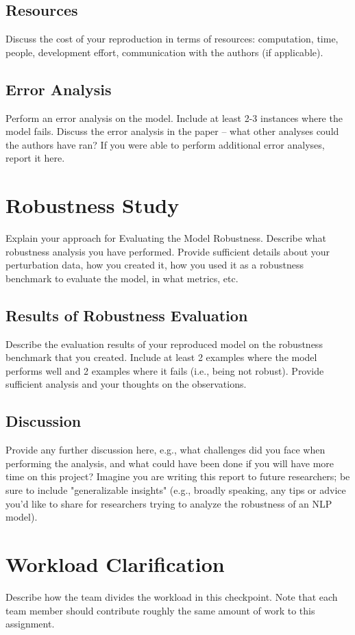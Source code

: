 \documentclass[11pt,a4paper]{article}
\begin{document}
\subsection{Resources}
Discuss the cost of your reproduction in terms of resources: computation, time, people, development effort, communication with the authors (if applicable).


\subsection{Error Analysis}
Perform an error analysis on the model. Include at least 2-3 instances where the model fails. Discuss the error analysis in the paper -- what other analyses could the authors have ran? If you were able to perform additional error analyses, report it here.

\section{Robustness Study}
Explain your approach for Evaluating the Model Robustness. Describe what robustness analysis you have performed. Provide sufficient details about your perturbation data, how you created it, how you used it as a robustness benchmark to evaluate the model, in what metrics, etc.

\subsection{Results of Robustness Evaluation}
Describe the evaluation results of your reproduced model on the robustness benchmark that you created. Include at least 2 examples where the model performs well and 2 examples where it fails (i.e., being not robust). Provide sufficient analysis and your thoughts on the observations.

\subsection{Discussion} 
Provide any further discussion here, e.g., what challenges did you face when performing the analysis, and what could have been done if you will have more time on this project? Imagine you are writing this report to future researchers; be sure to include "generalizable insights" (e.g., broadly speaking, any tips or advice you'd like to share for researchers trying to analyze the robustness of an NLP model).

\section{Workload Clarification}
Describe how  the team divides the workload in this checkpoint. Note that each team member should contribute roughly the same amount of work to this assignment.
\end{document}
